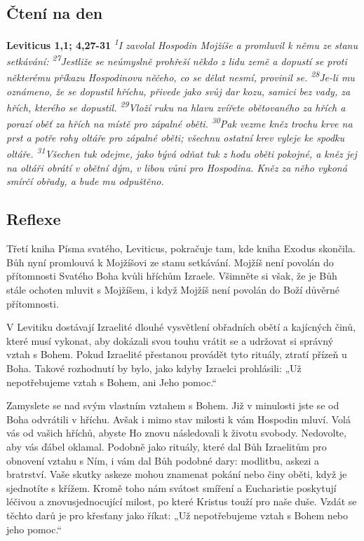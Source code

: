 \documentclass[11pt]{article}
\begin{document}
\subsection*{Čtení na den}
\textbf{Leviticus 1,1; 4,27-31}
\newline
\textit{
\textsuperscript{1}I zavolal Hospodin Mojžíše a promluvil k němu ze stanu setkávání:
\newline
\newline
\textsuperscript{27}Jestliže se neúmyslně prohřeší někdo z lidu země a dopustí se proti některému příkazu Hospodinovu něčeho, co se dělat nesmí, provinil se.
\textsuperscript{28}Je-li mu oznámeno, že se dopustil hříchu, přivede jako svůj dar kozu, samici bez vady, za hřích, kterého se dopustil.
\textsuperscript{29}Vloží ruku na hlavu zvířete obětovaného za hřích a porazí oběť za hřích na místě pro zápalné oběti.
\textsuperscript{30}Pak vezme kněz trochu krve na prst a potře rohy oltáře pro zápalné oběti; všechnu ostatní krev vyleje ke spodku oltáře.
\textsuperscript{31}Všechen tuk odejme, jako bývá odňat tuk z hodu oběti pokojné, a kněz jej na oltáři obrátí v obětní dým, v libou vůni pro Hospodina. Kněz za něho vykoná smírčí obřady, a bude mu odpuštěno.
}

\subsection*{Reflexe}
Třetí kniha Písma svatého, Leviticus, pokračuje tam, kde kniha Exodus skončila. Bůh nyní promlouvá k Mojžíšovi ze stanu
setkávání. Mojžíš není povolán do přítomnosti Svatého Boha kvůli hříchům Izraele. Všimněte si však, že je Bůh stále ochoten
mluvit s Mojžíšem, i když Mojžíš není povolán do Boží důvěrné přítomnosti.

V Levitiku dostávají Izraelité dlouhé vysvětlení obřadních obětí a kajícných činů, které musí vykonat, aby dokázali svou touhu
vrátit se a udržovat si správný vztah s Bohem. Pokud Izraelité přestanou provádět tyto rituály, ztratí přízeň u Boha. Takové
rozhodnutí by bylo, jako kdyby Izraelci prohlásili: „Už nepotřebujeme vztah s Bohem, ani Jeho pomoc.“

Zamyslete se nad svým vlastním vztahem s Bohem. Již v minulosti jste se od Boha odvrátili v hříchu. Avšak i mimo stav milosti k
vám Hospodin mluví. Volá vás od vašich hříchů, abyste Ho znovu následovali k životu svobody. Nedovolte, aby vás ďábel
oklamal. Podobně jako rituály, které dal Bůh Izraelitům pro obnovení vztahu s Ním, i vám dal Bůh podobné dary: modlitbu, askezi
a bratrství. Vaše skutky askeze mohou znamenat pokání nebo činy oběti, když je sjednotíte s křížem. Kromě toho nám svátost
smíření a Eucharistie poskytují léčivou a znovusjednocující milost, po které Kristus touží pro naše duše. Vzdát se těchto darů je pro
křesťany jako říkat: „Už nepotřebujeme vztah s Bohem nebo jeho pomoc.“
\end{document}
